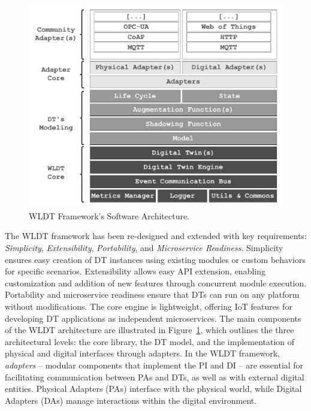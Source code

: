 \begin{figure}
    \centering
    \includegraphics[width=\columnwidth]{figures/engineering-wldt/wldt_architecture.pdf}
    \caption{WLDT Framework's Software Architecture.}
    \label{fig:wldt_architecture}
\end{figure}


The WLDT framework has been re-designed and extended with key requirements: \textit{Simplicity}, \textit{Extensibility}, \textit{Portability}, and \textit{Microservice Readiness}.
Simplicity ensures easy creation of DT instances using existing modules or custom behaviors for specific scenarios. 
Extensibility allows easy API extension, enabling customization and addition of new features through concurrent module execution.
Portability and microservice readiness ensure that DTs can run on any platform without modifications.
The core engine is lightweight, offering IoT features for developing DT applications as independent microservices.
The main components of the WLDT architecture are illustrated in Figure~\ref{fig:wldt_architecture}, which outlines the three architectural levels: the core library, the DT model, and the implementation of physical and digital interfaces through adapters.
In the WLDT framework, \textit{adapters} -- modular components that implement the PI and DI -- are essential for facilitating communication between \ac{PA}s and DTs, as well as with external digital entities.
Physical Adapters (PAs) interface with the physical world, while Digital Adapters (DAs) manage interactions within the digital environment.

